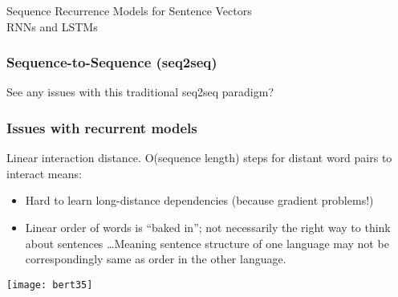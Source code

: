 \begin{frame}[fragile]\frametitle{}
\begin{center}
{\Large Sequence Recurrence Models for Sentence Vectors\\ \small RNNs and LSTMs}
\end{center}
\end{frame}

\begin{frame}[fragile]\frametitle{Sequence-to-Sequence (seq2seq)}

\begin{center}
See any issues with this traditional seq2seq paradigm?
\end{center}	

\end{frame}

\begin{frame}[fragile]\frametitle{Issues with recurrent models}


Linear interaction distance. O(sequence length) steps for distant word pairs to interact means:

\begin{itemize}
\item Hard to learn long-distance dependencies (because gradient problems!)
\item Linear order of words is ``baked in''; not necessarily the  right way to think about sentences \ldots Meaning sentence structure of one language may not be correspondingly same as order in the other language.
\end{itemize}	 

\begin{center}
\texttt{[image: bert35]}
\end{center}	

 
\end{frame}

